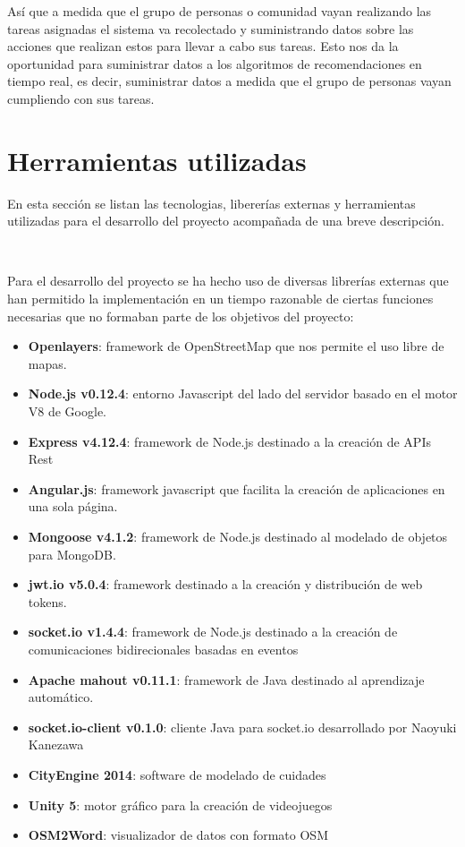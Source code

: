 Así que a medida que el grupo de personas o comunidad vayan realizando las tareas asignadas el sistema va recolectado y suministrando datos sobre las acciones que realizan estos para llevar a cabo sus tareas. Esto nos da la oportunidad para suministrar datos a los algoritmos de recomendaciones en tiempo real, es decir, suministrar datos a medida que el grupo de personas vayan cumpliendo con sus tareas.   

\section{Herramientas utilizadas}
\thispagestyle{empty}


En esta sección se listan las tecnologias, libererías externas y herramientas utilizadas para el desarrollo del proyecto acompañada de una breve descripción.

       \vspace{0.7cm}
\\
\thispagestyle{empty}

Para el desarrollo del proyecto se ha hecho uso de diversas librerías externas que han permitido la implementación en un tiempo razonable de ciertas funciones necesarias que no formaban parte de los objetivos del proyecto:

\begin{itemize}
       \item {\bfseries Openlayers}: framework de OpenStreetMap que nos permite el uso libre de mapas.
       \item {\bfseries Node.js v0.12.4}: entorno Javascript del lado del servidor basado en el motor V8 de Google. 
       \item {\bfseries Express v4.12.4}: framework de Node.js destinado a la creación de APIs Rest
       \item {\bfseries Angular.js}: framework javascript que facilita la creación de aplicaciones en una sola página. 
       \item {\bfseries Mongoose v4.1.2}: framework de Node.js destinado al modelado de objetos para MongoDB.
       \item {\bfseries jwt.io v5.0.4}: framework destinado a la creación y distribución de web tokens. 
       \item {\bfseries socket.io v1.4.4}: framework de Node.js destinado a la creación de comunicaciones bidirecionales basadas en eventos
       \item {\bfseries Apache mahout v0.11.1}: framework de Java destinado al aprendizaje automático.
       \item {\bfseries socket.io-client v0.1.0}: cliente Java para socket.io desarrollado por Naoyuki Kanezawa
       \item {\bfseries CityEngine 2014}: software de modelado de cuidades
       \item {\bfseries Unity 5}: motor gráfico para la creación de videojuegos
       \item {\bfseries OSM2Word}: visualizador de datos con formato OSM
\end{itemize}

